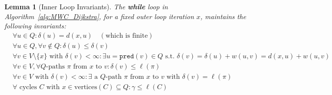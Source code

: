 \documentclass{article}
\newtheorem{lemma}{Lemma}
\begin{document}
\begin{lemma}[Inner Loop Invariants]
\label{lem:inner}
The {\bf while} loop in Algorithm~\ref{alg:MWC_Dijkstra}, for a fixed outer loop iteration $x$, maintains the following invariants:
\begin{align}
\label{eq:delta-eq}
&\forall u \in Q: \delta(u) = d(x,u) \quad (\text{which is finite}) \\
\label{eq:delta-less}
&\forall u \in Q, \forall v \notin Q: \delta(u) \leq \delta(v) \\
\label{eq:delta-pred}
&\forall v \in V \setminus \{x\} \text{ with } \delta(v) < \infty: \exists u = \texttt{pred}(v) \in Q \text{ s.t. } \delta(v) = \delta(u) + w(u,v) = d(x,u) + w(u,v) \\
\label{eq:deltaQpath1}
&\forall v \in V, \forall Q\text{-paths } \pi \text{ from } x \text{ to } v: \delta(v) \leq \ell(\pi) \\
\label{eq:deltaQpath2}
&\forall v \in V \text{ with } \delta(v) < \infty: \exists \text{ a } Q\text{-path } \pi \text{ from } x \text{ to } v \text{ with } \delta(v) = \ell(\pi) \\
\label{eq:gammaC}
&\forall \text{ cycles } C \text{ with } x \in \text{vertices}(C) \subseteq Q: \gamma \leq \ell(C)
\end{align}
\end{lemma}
\end{document}
